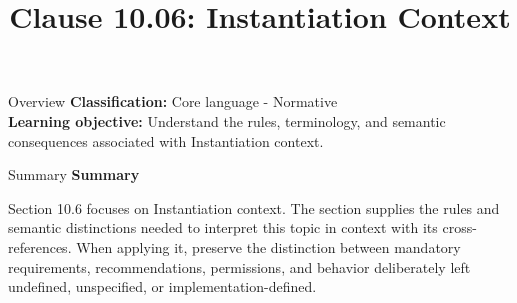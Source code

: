 \documentclass[10pt,letterpaper]{article}
\title{Clause 10.06: Instantiation Context}
\author{}
\date{}
\begin{document}
\maketitle
\begin{CornellOverviewBox}{Overview}
\textbf{Classification:} Core language - Normative\\[2pt]
\textbf{Learning objective:} Understand the rules, terminology, and semantic consequences associated with Instantiation context.
\end{CornellOverviewBox}\begin{CornellSummaryBox}{Summary}
{\sffamily\bfseries\color{Accent} Summary}\par\vspace{3pt}Section 10.6 focuses on Instantiation context. The section supplies the rules and semantic distinctions needed to interpret this topic in context with its cross-references. When applying it, preserve the distinction between mandatory requirements, recommendations, permissions, and behavior deliberately left undefined, unspecified, or implementation-defined.
\end{CornellSummaryBox}
\end{document}
